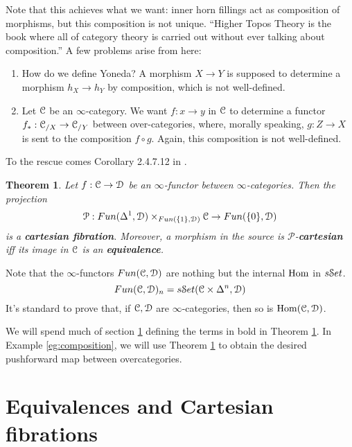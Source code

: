 \documentclass[10pt,a4paper,reqno,oneside]{book} %
\theoremstyle{plain}
\newtheorem{thm}{Theorem}[section]
\theoremstyle{definition}
\theoremstyle{remark}
\numberwithin{equation}{section}
\begin{document}
Note that this achieves what we want: inner horn fillings act as composition of morphisms, but this composition is not unique. 
``Higher Topos Theory is the book where all of category theory is carried out without ever talking about composition.'' 
A few problems arise
from here:

\begin{enumerate}
\item How do we define Yoneda? A morphism $X \to Y$ is supposed to determine a morphism $h_X \to h_Y$ by composition, which
is not well-defined.
\item Let $\mathcal C$ be an $\infty$-category. We want $f: x \to y$ in $\mathcal C$ to determine a functor $f_*: \mathcal C_{/X} \to \mathcal C_{/Y}$
between over-categories, where, morally speaking, $g: Z \to X$ is sent to the composition $f \circ g$.
Again, this composition is not well-defined.
\end{enumerate}

To the rescue comes Corollary 2.4.7.12 in \cite{HTT}. 
\begin{thm}
\label{thm:cartesian_fib}
Let $f: \mathcal C \to \mathcal D$ be an $\infty$-functor between $\infty$-categories. Then the projection
\[	\mathcal{P} : Fun(\Delta^1, \mathcal D) \times_{Fun(\{1\},\mathcal D)} \mathcal C \to Fun(\{0\}, \mathcal D) 	\]
is a \textbf{cartesian fibration}. Moreover, a morphism in the source is $\mathcal{P}$-\textbf{cartesian} iff its image in $\mathcal C$ 
is an \textbf{equivalence}.
\end{thm}
Note that the $\infty$-functors $Fun(\mathcal C,\mathcal D)$ are nothing but the internal $\operatorname{Hom}$ in $s\mathcal S et$. 
\[	Fun(\mathcal C,\mathcal D)_n = s\mathcal S et(\mathcal C \times \Delta^n, \mathcal D)	\]
It's standard to prove that, if $\mathcal C, \mathcal D$ are $\infty$-categories, then so is $\operatorname{Hom}(\mathcal C, \mathcal D)$.

We will spend much of section \ref{sect:cartesian} defining the terms in bold in Theorem \ref{thm:cartesian_fib}. In Example
\ref{eg:composition}, we will use Theorem \ref{thm:cartesian_fib} to obtain the desired pushforward map between overcategories.



\section{Equivalences and Cartesian fibrations}
\label{sect:cartesian}
\end{document}
